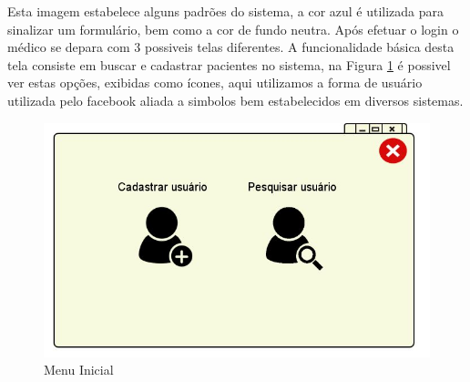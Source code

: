 \documentclass[12pt]{article}
\begin{document}
Esta imagem estabelece alguns padrões do sistema, a cor azul é utilizada para sinalizar um formulário, bem como a cor de fundo neutra. Após efetuar o login o médico se depara com 3 possiveis telas diferentes. A funcionalidade básica desta tela consiste em buscar e cadastrar pacientes no sistema, na Figura \ref{menu_sem_pendrive} é possivel ver estas opções, exibidas como ícones, aqui utilizamos a forma de usuário utilizada pelo facebook aliada a simbolos bem estabelecidos em diversos sistemas.

\begin{figure}[h]
\centering
\includegraphics[scale=0.6]{imagens/1-2Usuarios_Sem_Pendrive.jpg}
\caption{Menu Inicial}
\label{menu_sem_pendrive}
\end{figure}
\end{document}
